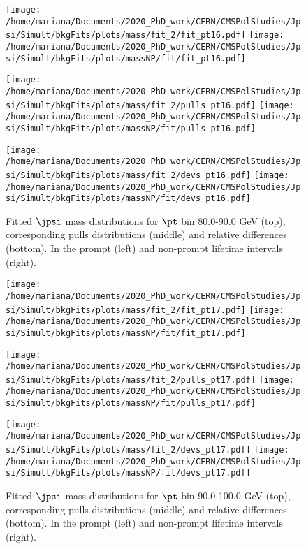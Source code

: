 \pagebreak

\begin{figure}[h!]
\centering
\texttt{[image: /home/mariana/Documents/2020\_PhD\_work/CERN/CMSPolStudies/Jpsi/Simult/bkgFits/plots/mass/fit\_2/fit\_pt16.pdf]}
\texttt{[image: /home/mariana/Documents/2020\_PhD\_work/CERN/CMSPolStudies/Jpsi/Simult/bkgFits/plots/massNP/fit/fit\_pt16.pdf]}

\texttt{[image: /home/mariana/Documents/2020\_PhD\_work/CERN/CMSPolStudies/Jpsi/Simult/bkgFits/plots/mass/fit\_2/pulls\_pt16.pdf]}
\texttt{[image: /home/mariana/Documents/2020\_PhD\_work/CERN/CMSPolStudies/Jpsi/Simult/bkgFits/plots/massNP/fit/pulls\_pt16.pdf]}

\texttt{[image: /home/mariana/Documents/2020\_PhD\_work/CERN/CMSPolStudies/Jpsi/Simult/bkgFits/plots/mass/fit\_2/devs\_pt16.pdf]}
\texttt{[image: /home/mariana/Documents/2020\_PhD\_work/CERN/CMSPolStudies/Jpsi/Simult/bkgFits/plots/massNP/fit/devs\_pt16.pdf]}
\caption{Fitted $\jpsi$ mass distributions for $\pt$ bin 80.0-90.0 GeV (top), corresponding pulls distributions (middle) and relative differences (bottom). In the prompt (left) and non-prompt lifetime intervals (right).}\label{f:m_fit_16}
\end{figure}

\pagebreak

\begin{figure}[h!]
\centering
\texttt{[image: /home/mariana/Documents/2020\_PhD\_work/CERN/CMSPolStudies/Jpsi/Simult/bkgFits/plots/mass/fit\_2/fit\_pt17.pdf]}
\texttt{[image: /home/mariana/Documents/2020\_PhD\_work/CERN/CMSPolStudies/Jpsi/Simult/bkgFits/plots/massNP/fit/fit\_pt17.pdf]}

\texttt{[image: /home/mariana/Documents/2020\_PhD\_work/CERN/CMSPolStudies/Jpsi/Simult/bkgFits/plots/mass/fit\_2/pulls\_pt17.pdf]}
\texttt{[image: /home/mariana/Documents/2020\_PhD\_work/CERN/CMSPolStudies/Jpsi/Simult/bkgFits/plots/massNP/fit/pulls\_pt17.pdf]}

\texttt{[image: /home/mariana/Documents/2020\_PhD\_work/CERN/CMSPolStudies/Jpsi/Simult/bkgFits/plots/mass/fit\_2/devs\_pt17.pdf]}
\texttt{[image: /home/mariana/Documents/2020\_PhD\_work/CERN/CMSPolStudies/Jpsi/Simult/bkgFits/plots/massNP/fit/devs\_pt17.pdf]}
\caption{Fitted $\jpsi$ mass distributions for $\pt$ bin 90.0-100.0 GeV (top), corresponding pulls distributions (middle) and relative differences (bottom). In the prompt (left) and non-prompt lifetime intervals (right).}\label{f:m_fit_17}
\end{figure}

